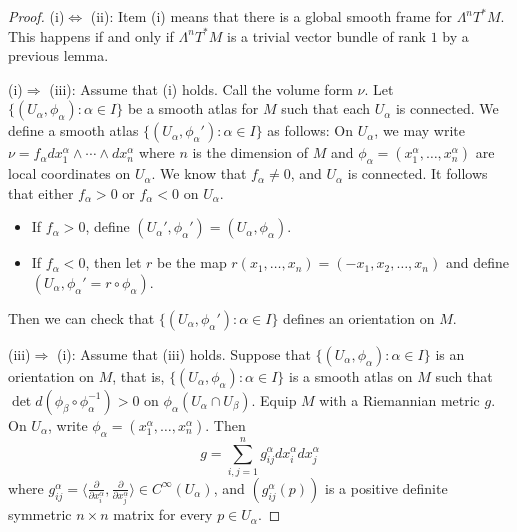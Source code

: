 \documentclass{amsart}
\numberwithin{equation}{section}
\theoremstyle{definition}
\theoremstyle{theorem}
\begin{document}
\begin{proof}
(i)$\Leftrightarrow$ (ii): Item (i) means that there is a global smooth frame for $\Lambda^nT^*M$. This happens if and only if $\Lambda^nT^*M$ is a trivial vector bundle of rank $1$ by  a previous lemma. 

\noindent
(i)$\Rightarrow$ (iii): 
Assume that (i) holds. Call the volume form $\nu$. Let $\{(U_\alpha, \phi_\alpha) : \alpha \in I\}$ be a smooth atlas for $M$ such that each $U_\alpha$ is connected. We define a smooth atlas $\{(U_\alpha, \phi_\alpha') : \alpha \in I\}$ as follows: On $U_\alpha$, we may write $\nu = f_\alpha dx_1^\alpha \wedge \cdots \wedge dx_n^\alpha$ where $n$ is the dimension of $M$ and $\phi_\alpha = (x_1^\alpha, \ldots, x_n^\alpha)$ are local coordinates on $U_\alpha$. We know that $f_\alpha \ne 0$, and $U_\alpha$ is connected. It follows that either $f_\alpha > 0$ or $f_\alpha < 0$ on $U_\alpha$. 
\begin{itemize}
\item If $f_\alpha > 0$, define $(U_\alpha',\phi_\alpha') = (U_\alpha, \phi_\alpha)$. 
\item If $f_\alpha < 0$, then let $r$ be the map $r(x_1, \ldots, x_n) = (-x_1, x_2, \ldots, x_n)$ and define $(U_\alpha, \phi_\alpha' = r \circ \phi_\alpha)$. 
\end{itemize}
Then we can check that $\{(U_\alpha, \phi_\alpha') : \alpha \in I\}$ defines an orientation on $M$. 

\noindent
(iii)$\Rightarrow$ (i):
Assume that (iii) holds. Suppose that $\{(U_\alpha, \phi_\alpha) : \alpha \in I\}$ is an orientation on $M$, that is, $\{(U_\alpha, \phi_\alpha) : \alpha \in I\}$ is a smooth atlas on $M$ such that $\det d(\phi_\beta \circ \phi_\alpha^{-1}) > 0$ on 
$\phi_\alpha(U_\alpha\cap U_\beta)$. Equip $M$ with a Riemannian metric $g$. On $U_\alpha$, write $\phi_\alpha = (x_1^\alpha, \ldots, x_n^\alpha)$. Then 
\[
g = \sum_{i,j=1}^n g_{ij}^\alpha dx_i^\alpha dx_j^\alpha
\]
where $g_{ij}^\alpha=\langle \frac{\partial}{\partial x_i^\alpha},
\frac{\partial}{\partial x_j^\alpha} \rangle\in C^\infty(U_\alpha)$,
and $(g_{ij}^\alpha(p))$ is a positive definite symmetric $n\times n$ matrix for every $p\in U_\alpha$.



\end{proof}
\end{document}

